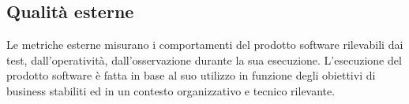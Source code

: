 \subsection{Qualità esterne}
Le metriche esterne misurano i comportamenti del prodotto software rilevabili dai test, dall'operatività, dall'osservazione durante la sua esecuzione. L'esecuzione del prodotto software è fatta in base al suo utilizzo in funzione degli obiettivi di business stabiliti ed in un contesto organizzativo e tecnico rilevante.
